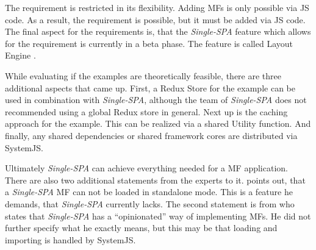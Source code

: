 The  requirement is restricted in its flexibility.
Adding \acp{MF} is only possible via \ac{JS} code.
As a result, the  requirement is possible, but it must be added via \ac{JS} code.
The final aspect for the requirements is, that the \textit{Single-SPA} feature which allows for the  requirement is currently in a beta phase.
The feature is called Layout Engine \cite{singlespa.2020}.

While evaluating if the examples are theoretically feasible, there are three additional aspects that came up.
First, a Redux Store for the \hyperref[cha:evaluation_enterprise]{} example can be used in combination with \textit{Single-SPA}, although the team of \textit{Single-SPA} does not recommended using a global Redux store in general.
Next up is the caching approach for the \hyperref[cha:evaluation_consumer]{} example.
This can be realized via a shared Utility function.
And finally, any shared dependencies or shared framework cores are distributed via SystemJS.


Ultimately \textit{Single-SPA} can achieve everything needed for a \ac{MF} application.
There are also two additional statements from the experts to it.
\textciteSteyer{} points out, that a \textit{Single-SPA} \ac{MF} can not be loaded in standalone mode.
This is a feature he demands, that \textit{Single-SPA} currently lacks.
The second statement is from \textciteMezzalira{} who states that \textit{Single-SPA} has a \enquote{opinionated} way of implementing \acp{MF}.
He did not further specify what he exactly means, but this may be that loading and importing is handled by SystemJS.

